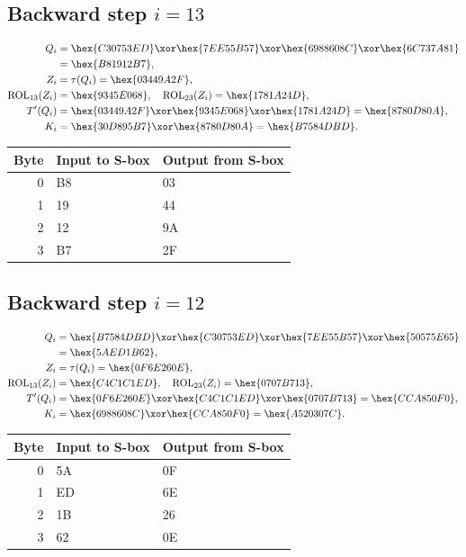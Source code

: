 \subsection*{Backward step $i=13$}
\begin{align*}
Q_i&=\hex{C30753ED}\xor\hex{7EE55B57}\xor\hex{6988608C}\xor\hex{6C737A81}\\&=\hex{B81912B7},\\
Z_i&=\tau(Q_i)=\hex{03449A2F},\\
\operatorname{ROL}_{13}(Z_i)&=\hex{9345E068},\quad\operatorname{ROL}_{23}(Z_i)=\hex{1781A24D},\\
T'(Q_i)&=\hex{03449A2F}\xor\hex{9345E068}\xor\hex{1781A24D}=\hex{8780D80A},\\
K_i&=\hex{30D895B7}\xor\hex{8780D80A}=\hex{B7584DBD}.\end{align*}
\begingroup\small
\begin{longtable}{rll}
\toprule
Byte & Input to S-box & Output from S-box\\\midrule
\endhead
0 & B8 & 03\\
1 & 19 & 44\\
2 & 12 & 9A\\
3 & B7 & 2F\\
\bottomrule\end{longtable}
\endgroup
\subsection*{Backward step $i=12$}
\begin{align*}
Q_i&=\hex{B7584DBD}\xor\hex{C30753ED}\xor\hex{7EE55B57}\xor\hex{50575E65}\\&=\hex{5AED1B62},\\
Z_i&=\tau(Q_i)=\hex{0F6E260E},\\
\operatorname{ROL}_{13}(Z_i)&=\hex{C4C1C1ED},\quad\operatorname{ROL}_{23}(Z_i)=\hex{0707B713},\\
T'(Q_i)&=\hex{0F6E260E}\xor\hex{C4C1C1ED}\xor\hex{0707B713}=\hex{CCA850F0},\\
K_i&=\hex{6988608C}\xor\hex{CCA850F0}=\hex{A520307C}.\end{align*}
\begingroup\small
\begin{longtable}{rll}
\toprule
Byte & Input to S-box & Output from S-box\\\midrule
\endhead
0 & 5A & 0F\\
1 & ED & 6E\\
2 & 1B & 26\\
3 & 62 & 0E\\
\bottomrule\end{longtable}
\endgroup
